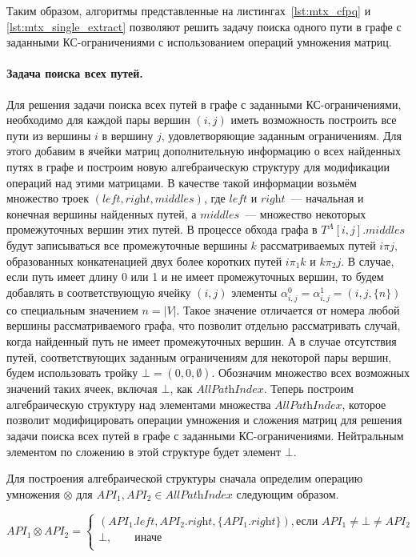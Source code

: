 Таким образом, алгоритмы представленные на листингах~\ref{lst:mtx_cfpq} и \ref{lst:mtx_single_extract} позволяют решить задачу поиска одного пути в графе с заданными КС-ограничениями с использованием операций умножения матриц.
 
\paragraph{Задача поиска всех путей.}
Для решения задачи поиска всех путей в графе с заданными КС-ограничениями, необходимо для каждой пары вершин $(i, j)$ иметь возможность построить все пути из вершины $i$ в вершину $j$, удовлетворяющие заданным ограничениям. Для этого добавим в ячейки матриц дополнительную информацию о всех найденных путях в графе и построим новую алгебраическую структуру для модификации операций над этими матрицами. В качестве такой информации возьмём множество троек $(\textit{left}, \textit{right}, \textit{middles})$, где $\textit{left}$ и $\textit{right}$~--- начальная и конечная вершины найденных путей, а $\textit{middles}$~--- множество некоторых промежуточных вершин этих путей. В процессе обхода графа в $T^A[i, j].\textit{middles}$ будут записываться все промежуточные вершины $k$ рассматриваемых путей $i \pi j$, образованных конкатенацией двух более коротких путей $i \pi_1 k$ и $k \pi_2 j$. В случае, если путь имеет длину 0 или 1 и не имеет промежуточных вершин, то будем добавлять в соответствующую ячейку $(i, j)$ элементы $\alpha^0_{i, j} = \alpha^1_{i, j} = (i, j, \{n\})$ со специальным значением $n = |V|$. Такое значение отличается от номера любой вершины рассматриваемого графа, что позволит отдельно рассматривать случай, когда найденный путь не имеет промежуточных вершин. А в случае отсутствия путей, соответствующих заданным ограничениям для некоторой пары вершин, будем использовать тройку $\bot = (0, 0, \emptyset)$.  Обозначим множество всех возможных значений таких ячеек, включая $\bot$, как $\textit{AllPathIndex}$. Теперь построим алгебраическую структуру над элементами множества $\textit{AllPathIndex}$, которое позволит модифицировать операции умножения и сложения матриц для решения задачи поиска всех путей в графе с заданными КС-ограничениями. Нейтральным элементом по сложению в этой структуре будет элемент $\bot$.

Для построения алгебраической структуры сначала определим операцию умножения $\otimes$ для \mbox{$\textit{API}_1, \textit{API}_2 \in \textit{AllPathIndex}$} следующим образом.

$$\textit{API}_1 \otimes \textit{API}_2 = \begin{cases}
      (\textit{API}_1.\textit{left}, \textit{API}_2.\textit{right}, \{\textit{API}_1.\textit{right}\}), \text{если $\textit{API}_1 \neq \bot \neq \textit{API}_2$} \\
      \bot, \qquad \text{иначе} \\
    \end{cases}\
$$


